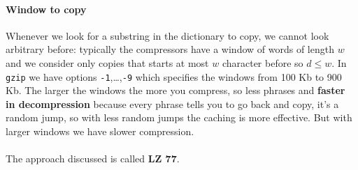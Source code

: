 \documentclass[10pt]{report}
\begin{document}
\paragraph{Window to copy} Whenever we look for a substring in the dictionary to copy, we cannot look arbitrary before: typically the compressors have a window of words of length $w$ and we consider only copies that starts at most $w$ character before so $d\leq w$. In \texttt{gzip} we have options \texttt{-1},\ldots,\texttt{-9} which specifies the windows from 100 Kb to 900 Kb. The larger the windows the more you compress, so less phrases and \textbf{faster in decompression} because every phrase tells you to go back and copy, it's a random jump, so with less random jumps the caching is more effective. But with larger windows we have slower compression.\\\\
The approach discussed is called \textbf{LZ 77}.
\end{document}
